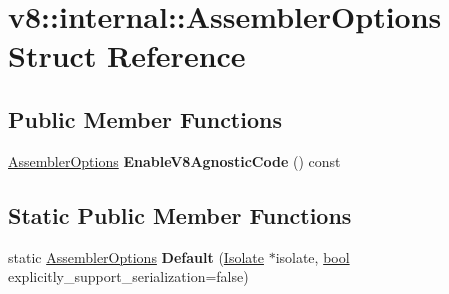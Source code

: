 \hypertarget{structv8_1_1internal_1_1AssemblerOptions}{}\section{v8\+:\+:internal\+:\+:Assembler\+Options Struct Reference}
\label{structv8_1_1internal_1_1AssemblerOptions}
\subsection*{Public Member Functions}
\begin{DoxyCompactItemize}
\item 
\mbox{\label{structv8_1_1internal_1_1AssemblerOptions_a8d130e8aa3930580ae7a291294d5523f}} 
\mbox{\hyperlink{structv8_1_1internal_1_1AssemblerOptions}{Assembler\+Options}} {\bfseries Enable\+V8\+Agnostic\+Code} () const
\end{DoxyCompactItemize}
\subsection*{Static Public Member Functions}
\begin{DoxyCompactItemize}
\item 
\mbox{\label{structv8_1_1internal_1_1AssemblerOptions_a837553b76d1204ae0abd993acb6e629b}} 
static \mbox{\hyperlink{structv8_1_1internal_1_1AssemblerOptions}{Assembler\+Options}} {\bfseries Default} (\mbox{\hyperlink{classv8_1_1internal_1_1Isolate}{Isolate}} $\ast$isolate, \mbox{\hyperlink{classbool}{bool}} explicitly\+\_\+support\+\_\+serialization=false)
\end{DoxyCompactItemize}
